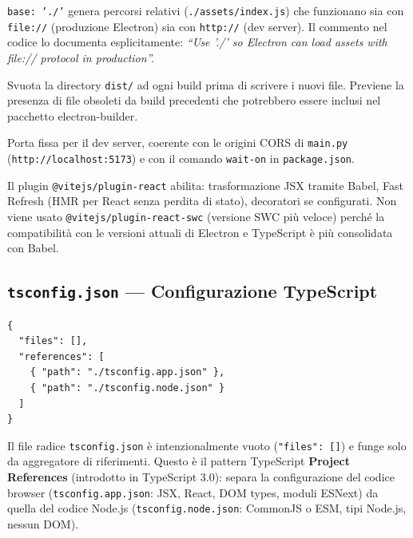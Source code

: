 \documentclass[a4paper,12pt]{article}
\renewcommand{\paragraph}[1]{%
  \par\vspace{4pt}%
  \noindent{\bfseries #1}\par\vspace{2pt}%
  \noindent\ignorespaces
}
\begin{document}
\texttt{base: './'} genera percorsi relativi (\texttt{./assets/index.js})
che funzionano sia con \texttt{file://} (produzione Electron) sia con
\texttt{http://} (dev server). Il commento nel codice lo documenta
esplicitamente: \textit{``Use './' so Electron can load assets with
file:// protocol in production''.}

\paragraph{\texttt{emptyOutDir: true}}
Svuota la directory \texttt{dist/} ad ogni build prima di scrivere i
nuovi file. Previene la presenza di file obsoleti da build precedenti
che potrebbero essere inclusi nel pacchetto electron-builder.

\paragraph{\texttt{port: 5173}}
Porta fissa per il dev server, coerente con le origini CORS di
\texttt{main.py} (\texttt{http://localhost:5173}) e con il comando
\texttt{wait-on} in \texttt{package.json}.

\paragraph{\texttt{plugins: [react()]}}
Il plugin \texttt{@vitejs/plugin-react} abilita: trasformazione JSX
tramite Babel, Fast Refresh (HMR per React senza perdita di stato),
decoratori se configurati. Non viene usato \texttt{@vitejs/plugin-react-swc}
(versione SWC pi\`{u} veloce) perch\'{e} la compatibilit\`{a} con le
versioni attuali di Electron e TypeScript \`{e} pi\`{u} consolidata
con Babel.

\subsection{\texttt{tsconfig.json} --- Configurazione TypeScript}

\begin{lstlisting}[language={}]
{
  "files": [],
  "references": [
    { "path": "./tsconfig.app.json" },
    { "path": "./tsconfig.node.json" }
  ]
}
\end{lstlisting}

\noindent Il file radice \texttt{tsconfig.json} \`{e} intenzionalmente vuoto
(\texttt{"files": []}) e funge solo da aggregatore di riferimenti.
Questo \`{e} il pattern TypeScript \textbf{Project References} (introdotto
in TypeScript 3.0): separa la configurazione del codice browser
(\texttt{tsconfig.app.json}: JSX, React, DOM types, moduli ESNext)
da quella del codice Node.js (\texttt{tsconfig.node.json}: CommonJS
o ESM, tipi Node.js, nessun DOM).
\end{document}
